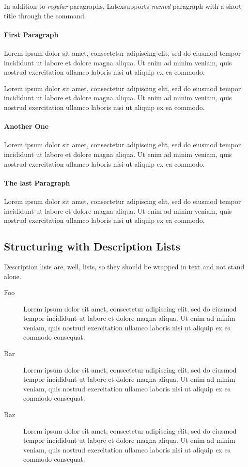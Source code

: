 In addition to \emph{regular} paragraphs, Latexsupports \emph{named} paragraph with a short title through the  command.

\paragraph{First Paragraph} Lorem ipsum dolor sit amet, consectetur adipiscing elit, sed do eiusmod tempor incididunt ut labore et dolore magna aliqua. Ut enim ad minim veniam, quis nostrud exercitation ullamco laboris nisi ut aliquip ex ea commodo.

Lorem ipsum dolor sit amet, consectetur adipiscing elit, sed do eiusmod tempor incididunt ut labore et dolore magna aliqua. Ut enim ad minim veniam, quis nostrud exercitation ullamco laboris nisi ut aliquip ex ea commodo.

\paragraph{Another One} Lorem ipsum dolor sit amet, consectetur adipiscing elit, sed do eiusmod tempor incididunt ut labore et dolore magna aliqua. Ut enim ad minim veniam, quis nostrud exercitation ullamco laboris nisi ut aliquip ex ea commodo.

\paragraph{The last Paragraph} Lorem ipsum dolor sit amet, consectetur adipiscing elit, sed do eiusmod tempor incididunt ut labore et dolore magna aliqua. Ut enim ad minim veniam, quis nostrud exercitation ullamco laboris nisi ut aliquip ex ea commodo.


\subsection{Structuring with Description Lists}

Description lists are, well, lists, so they should be wrapped in text and not stand alone.

\begin{description}
%
\item[Foo] Lorem ipsum dolor sit amet, consectetur adipiscing elit, sed do eiusmod tempor incididunt ut labore et dolore magna aliqua. Ut enim ad minim veniam, quis nostrud exercitation ullamco laboris nisi ut aliquip ex ea commodo consequat.
%
\item[Bar] Lorem ipsum dolor sit amet, consectetur adipiscing elit, sed do eiusmod tempor incididunt ut labore et dolore magna aliqua. Ut enim ad minim veniam, quis nostrud exercitation ullamco laboris nisi ut aliquip ex ea commodo consequat.
%
\item[Baz] Lorem ipsum dolor sit amet, consectetur adipiscing elit, sed do eiusmod tempor incididunt ut labore et dolore magna aliqua. Ut enim ad minim veniam, quis nostrud exercitation ullamco laboris nisi ut aliquip ex ea commodo consequat.
%
\end{description}

